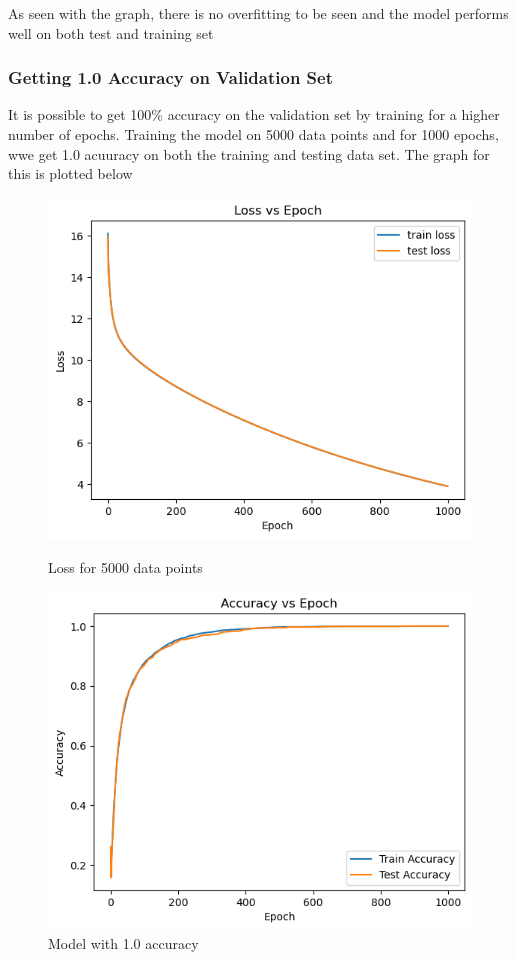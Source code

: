 \documentclass{article}
\begin{document}
\noindent As seen with the graph, there is no overfitting to be seen and the model performs well on both test and training set
\subsubsection*{Getting 1.0 Accuracy on Validation Set}
It is possible to get 100\% accuracy on the validation set by training for a higher number of epochs.
Training the model on 5000 data points and for 1000 epochs, wwe get 1.0 acuuracy on both the training and testing data set. The graph for this is plotted below
\begin{figure}[H]
    \centering
    \begin{minipage}{0.45\textwidth}
        \centering
        \includegraphics[width=1\textwidth]{graphs/loss_1.0.png} %
        \caption{Loss for 5000 data points}
    \end{minipage}\hfill
    \begin{minipage}{0.45\textwidth}
        \centering
        \includegraphics[width=1\textwidth]{graphs/accuracy_1.0.png} %
        \caption{Model with 1.0 accuracy}
    \end{minipage}
\end{figure}
\end{document}
